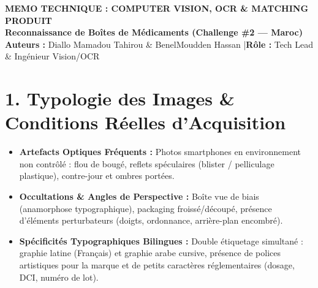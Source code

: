 \documentclass[10pt,a4paper]{article}
\begin{document}
\begin{center}
    {\color{primary}\Large \bfseries MEMO TECHNIQUE : COMPUTER VISION, OCR \& MATCHING PRODUIT}\\[2pt]
    {\color{secondary}\bfseries Reconnaissance de Boîtes de Médicaments (Challenge \#2 --- Maroc)}\\[2pt]
    {\small \color{darktext} \textbf{Auteurs :} Diallo Mamadou Tahirou \& BenelMoudden Hassan \quad|\quad \textbf{Rôle :} Tech Lead \& Ingénieur Vision/OCR}
\end{center}

\vspace{-4pt}

\section*{1. Typologie des Images \& Conditions Réelles d'Acquisition}
\begin{itemize}
    \item \textbf{Artefacts Optiques Fréquents :} Photos smartphones en environnement non contrôlé : flou de bougé, reflets spéculaires (blister / pelliculage plastique), contre-jour et ombres portées.
    \item \textbf{Occultations \& Angles de Perspective :} Boîte vue de biais (anamorphose typographique), packaging froissé/découpé, présence d'éléments perturbateurs (doigts, ordonnance, arrière-plan encombré).
    \item \textbf{Spécificités Typographiques Bilingues :} Double étiquetage simultané : graphie latine (Français) et graphie arabe cursive, présence de polices artistiques pour la marque et de petits caractères réglementaires (dosage, DCI, numéro de lot).
\end{itemize}

\end{document}
